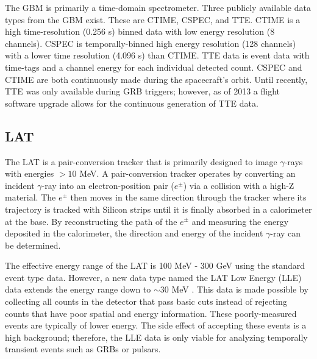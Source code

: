 The GBM is primarily a time-domain spectrometer. Three publicly
available data types from the GBM exist. These are CTIME, CSPEC, and
TTE. CTIME is a high time-resolution (0.256 s) binned data with low
energy resolution (8 channels). CSPEC is temporally-binned high energy
resolution (128 channels) with a lower time resolution (4.096 s) than
CTIME. TTE data is event data with time-tags and a channel energy for
each individual detected count. CSPEC and CTIME are both continuously
made during the spacecraft's orbit. Until recently, TTE was only
available during GRB triggers; however, as of 2013 a flight software
upgrade allows for the continuous generation of TTE data.




\subsection{LAT}
The LAT is a pair-conversion tracker that is primarily designed to
image $\gamma$-rays with energies $>10$ MeV. A pair-conversion tracker
operates by converting an incident $\gamma$-ray into an
electron-position pair ($e^{\pm}$) via a collision with a high-Z
material. The $e^{\pm}$ then moves in the same direction through the
tracker where its trajectory is tracked with Silicon strips until it
is finally absorbed in a calorimeter at the base. By reconstructing
the path of the $e^{\pm}$ and measuring the energy deposited in the
calorimeter, the direction and energy of the incident $\gamma$-ray can
be determined.

The effective energy range of the LAT is 100 MeV - 300 GeV using the
standard event type data. However, a new data type named the LAT Low
Energy (LLE) data extends the energy range down to $\sim$30 MeV
\cite{Vero:2010}. This data is made possible by collecting all counts in the
detector that pass basic cuts instead of rejecting counts that have
poor spatial and energy information. These poorly-measured events are
typically of lower energy. The side effect of accepting these events
is a high background; therefore, the LLE data is only viable for
analyzing temporally transient events such as GRBs or pulsars.



